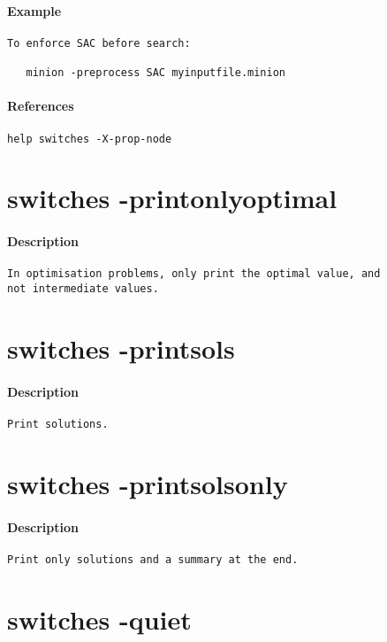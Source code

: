\paragraph{Example}
{\footnotesize
\begin{verbatim}
To enforce SAC before search:

   minion -preprocess SAC myinputfile.minion
\end{verbatim}
}
\paragraph{References}
{\footnotesize
\begin{verbatim}
help switches -X-prop-node
\end{verbatim}
}
\section{switches -printonlyoptimal}
\paragraph{Description}
{\footnotesize
\begin{verbatim}
In optimisation problems, only print the optimal value, and
not intermediate values.
\end{verbatim}
}
\section{switches -printsols}
\paragraph{Description}
{\footnotesize
\begin{verbatim}
Print solutions.
\end{verbatim}
}
\section{switches -printsolsonly}
\paragraph{Description}
{\footnotesize
\begin{verbatim}
Print only solutions and a summary at the end.
\end{verbatim}
}
\section{switches -quiet}
